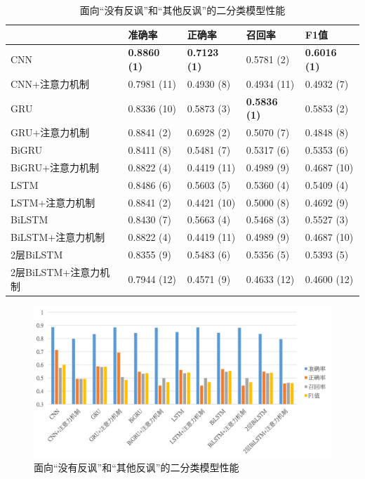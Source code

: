 \begin{table}[htb]
  \centering
  \begin{minipage}[t]{\linewidth}
  \caption{面向“没有反讽”和“其他反讽”的二分类模型性能}
  \label{tab:exp_irony_det_Bb03_result}
    \begin{tabularx}{\linewidth}{X|llll}
    \toprule[1.5pt]
    & 准确率 & 正确率 & 召回率 & F1值 \\
    \hline
    CNN & \bf 0.8860 (1) & \bf 0.7123 (1) & 0.5781 (2) & \bf 0.6016 (1) \\ %
    CNN+注意力机制 & 0.7981 (11) & 0.4930 (8) & 0.4934 (11) & 0.4932 (7) \\ %
    \hline
    GRU & 0.8336 (10) & 0.5873 (3) & \bf 0.5836 (1) & 0.5853 (2) \\ %
    GRU+注意力机制 & 0.8841 (2) & 0.6928 (2) & 0.5070 (7) & 0.4848 (8) \\ %
    \hline
    BiGRU & 0.8411 (8) & 0.5481 (7) & 0.5317 (6) & 0.5353 (6) \\ %
    BiGRU+注意力机制 & 0.8822 (4) & 0.4419 (11) & 0.4989 (9) & 0.4687 (10) \\ %
    \hline
    LSTM & 0.8486 (6) & 0.5603 (5) & 0.5360 (4) & 0.5409 (4) \\ %
    LSTM+注意力机制 & 0.8841 (2) & 0.4421 (10) & 0.5000 (8) & 0.4692 (9) \\ %
    \hline
    BiLSTM & 0.8430 (7) & 0.5663 (4) & 0.5468 (3) & 0.5527 (3) \\ %
    BiLSTM+注意力机制 & 0.8822 (4) & 0.4419 (11) & 0.4989 (9) & 0.4687 (10) \\ %
    \hline
    2层BiLSTM & 0.8355 (9) & 0.5483 (6) & 0.5356 (5) & 0.5393 (5) \\ %
    2层BiLSTM+注意力机制 & 0.7944 (12) & 0.4571 (9) & 0.4633 (12) & 0.4600 (12) \\ %
    \bottomrule[1.5pt]
    \end{tabularx}
  \end{minipage}
\end{table}

\begin{figure}[H]
  \centering
  \includegraphics[width=\textwidth]{img/exp_irony_det_Bb03_single_result_bar.png}
  \caption{面向“没有反讽”和“其他反讽”的二分类模型性能}
  \label{fig:exp_irony_det_Bb03_single_result_bar}
\end{figure}


